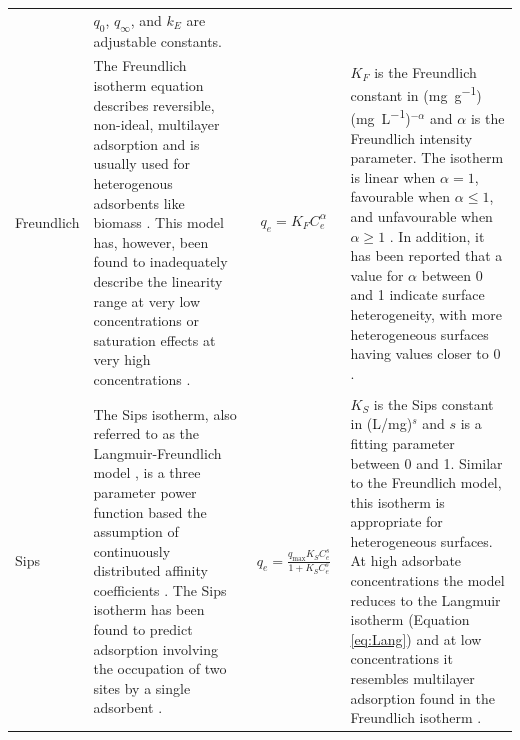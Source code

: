 \begin{landscape}
\begin{footnotesize}
\begin{longtable}{>{\raggedright\arraybackslash}p{2cm}p{7.25cm}p{4.5cm}p{7.25cm}}
			& $ q_0 $, $ q_\infty $, and $ k_E $ are adjustable constants. \\
			
			
			
			Freundlich
			
			& The Freundlich isotherm equation describes reversible, non-ideal, multilayer adsorption and is usually used for heterogenous adsorbents like biomass \parencite{Foo2010}. This model has, however, been found to inadequately describe the linearity range at very low concentrations or saturation effects at very high concentrations \parencite{Tran2017}.
			
			& \begin{align}
			q_e=K_FC_e^\alpha \label{eq:freund}
			\end{align}
			
			& $K_F$ is the Freundlich constant in (\si{\milli\gram\per\gram})(\si{\milli\gram\per\liter})$^{-\alpha}$ and $\alpha$  is the Freundlich intensity parameter. The isotherm is linear when $\alpha=1$, favourable when $\alpha \le 1$, and unfavourable when $\alpha \ge 1$ \parencite{Tran2017}. In addition, it has been reported that a value for $\alpha$ between 0 and 1 indicate surface heterogeneity,  with more heterogeneous surfaces having values closer to 0 \parencite{Foo2010}. \\
			
			Sips
			
			& The Sips isotherm, also referred to as the Langmuir-Freundlich  model \parencite{Jeppu2012}, is a three parameter power function based the assumption of continuously distributed affinity coefficients \parencite{Bolster2007a}. The Sips isotherm has been found to predict adsorption involving the occupation of two sites by a single adsorbent \parencite{Chan2012}. 
			
			& \begin{align}
			q_e=\frac{q_{\mathrm{max}}K_{S}C_e^s}{1+K_{S}C_e^s} \label{eq:sips}
			\end{align}
			
			& $K_{S}$ is the Sips constant in (L/mg)$^s$ and $s$ is a fitting parameter between 0 and 1. Similar to the Freundlich model, this isotherm is appropriate for heterogeneous surfaces. At high adsorbate concentrations the model reduces to the Langmuir isotherm (Equation \ref{eq:Lang}) and at low concentrations it resembles multilayer adsorption found in the Freundlich isotherm \parencite{Ayawei2017}. \\
			

\end{longtable}
\end{footnotesize}
\end{landscape}
